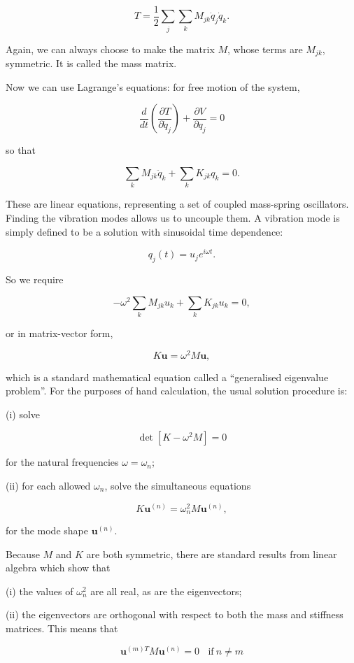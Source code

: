   $$T=\dfrac{1}{2}\sum_j \sum_k M_{jk} \dot{q}_j \dot{q}_k . \tag{2}$$ 

  Again, we can always choose to make the matrix $M$, whose terms are $M_{jk}$, 
  symmetric. It is called the mass matrix. 

  Now we can use Lagrange's equations: for free motion of the system, 

  $$\dfrac{d}{dt}\left( \dfrac{\partial T}{\partial 
  \dot{q}_j}\right)+\dfrac{\partial V}{\partial q_j}=0 \tag{3}$$ 

  so that 

  $$\sum_k M_{jk} \ddot{q}_k + \sum_k K_{jk} q_k =0. \tag{4}$$ 

  These are linear equations, representing a set of coupled mass-spring 
  oscillators. Finding the vibration modes allows us to uncouple them. A 
  vibration mode is simply defined to be a solution with sinusoidal time 
  dependence: 

  $$q_j(t)=u_j e^{i\omega t}. \tag{5}$$ 

  So we require 

  $$-\omega^2 \sum_k M_{jk} u_k + \sum_k K_{jk} u_k =0, \tag{6}$$ 

  or in matrix-vector form, 

  $$K \mathbf{u}=\omega^2 M \mathbf{u}, \tag{7}$$ 

  which is a standard mathematical equation called a ``generalised eigenvalue 
  problem''. For the purposes of hand calculation, the usual solution procedure 
  is: 

  (i) solve 

  $$\det[K -\omega^2 M ]=0 \tag{8}$$ 

  for the natural frequencies $\omega=\omega_n$; 

  (ii) for each allowed $\omega_n$, solve the simultaneous equations 

  $$K \mathbf{u}^{(n)}=\omega_n^2 M \mathbf{u}^{(n)}, \tag{9}$$ 

  for the mode shape $\mathbf{u}^{(n)}$. 

  Because $M$ and $K$ are both symmetric, there are standard results from 
  linear algebra which show that 

  (i) the values of $\omega_n^2$ are all real, as are the eigenvectors; 

  (ii) the eigenvectors are orthogonal with respect to both the mass and 
  stiffness matrices. This means that 

  $$ \mathbf{u}^{(m)T} M \mathbf{u}^{(n)} = 0 \mathrm{~~~~if~} n \ne m 
  \tag{10}$$ 

